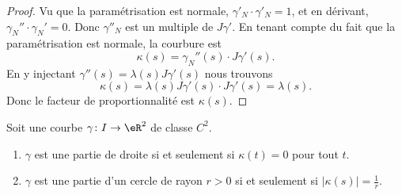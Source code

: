 \begin{proof}
    Vu que la paramétrisation est normale, \( \gamma'_N\cdot \gamma'_N=1\), et en dérivant, \( \gamma_N''\cdot\gamma_N'=0\). Donc \( \gamma''_N\) est un multiple de \( J\gamma'\). En tenant compte du fait que la paramétrisation est normale, la courbure est
    \begin{equation}
        \kappa(s)=\gamma_N''(s)\cdot J\gamma'(s).
    \end{equation}
    En y injectant \( \gamma''(s)=\lambda(s)J\gamma'(s)\) nous trouvons
    \begin{equation}
        \kappa(s)=\lambda(s)J\gamma'(s)\cdot J\gamma'(s)=\lambda(s).
    \end{equation}
    Donc le facteur de proportionnalité est \( \kappa(s)\).
\end{proof}

\begin{theorem}     \label{THOooDLDVooFQnLWn}
    Soit une courbe \( \gamma\colon I\to \eR^2\) de classe \( C^2\).
    \begin{enumerate}
        \item
            \( \gamma\) est une partie de droite si et seulement si \( \kappa(t)=0\) pour tout \( t\).
        \item
            \( \gamma\) est une partie d'un cercle de rayon \( r>0\) si et seulement si \( | \kappa(s) |=\frac{1}{ r }\).
    \end{enumerate}
\end{theorem}

